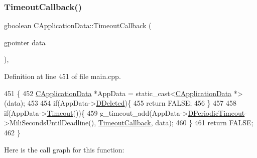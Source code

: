 \subsubsection{\texorpdfstring{Timeout\+Callback()}{TimeoutCallback()}}
{\footnotesize\ttfamily gboolean C\+Application\+Data\+::\+Timeout\+Callback (\begin{DoxyParamCaption}\item[{gpointer}]{data }\end{DoxyParamCaption})\hspace{0.3cm}{\ttfamily [static]}, {\ttfamily [protected]}}



Definition at line 451 of file main.\+cpp.


\begin{DoxyCode}
451                                                        \{
452     \hyperlink{classCApplicationData}{CApplicationData} *AppData = \textcolor{keyword}{static\_cast<}\hyperlink{classCApplicationData}{CApplicationData} *\textcolor{keyword}{>}(data);
453 
454     \textcolor{keywordflow}{if}(AppData->\hyperlink{classCApplicationData_a0a8651f95f3d48befd6e02a286ecdc82}{DDeleted})\{
455         \textcolor{keywordflow}{return} FALSE;   
456     \}
457     
458     \textcolor{keywordflow}{if}(AppData->\hyperlink{classCApplicationData_aae0775b38fac01308e8a81b64db49500}{Timeout}())\{
459         g\_timeout\_add(AppData->\hyperlink{classCApplicationData_a0265cb7aba9f099faed2a1c8ee588d33}{DPeriodicTimeout}->MiliSecondsUntilDeadline(), 
      \hyperlink{classCApplicationData_af66e15f6935f053b46a11aaa51a869c9}{TimeoutCallback}, data);
460     \}
461     \textcolor{keywordflow}{return} FALSE;
462 \}
\end{DoxyCode}
Here is the call graph for this function\+:
\nopagebreak
